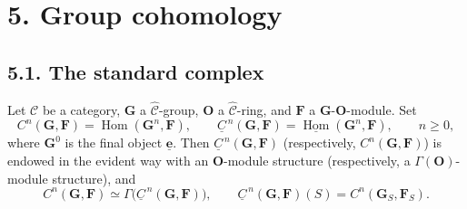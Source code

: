 
\section*{5. Group cohomology}

\subsection*{5.1. The standard complex}

Let \(\mathscr C\) be a category, \(\mathbf G\) a
\(\widehat{\mathscr C}\)-group, \(\mathbf O\) a
\(\widehat{\mathscr C}\)-ring, and \(\mathbf F\) a
\(\mathbf G\)-\(\mathbf O\)-module. Set
\[
  C^n(\mathbf G,\mathbf F)
    =\operatorname{Hom}(\mathbf G^n,\mathbf F),
  \qquad
  \underline C^{\,n}(\mathbf G,\mathbf F)
    =\underline{\operatorname{Hom}}(\mathbf G^n,\mathbf F),
  \qquad n\geq0,
\]
where \(\mathbf G^0\) is the final object \(\underline{\mathbf e}\).
Then \(\underline C^{\,n}(\mathbf G,\mathbf F)\) (respectively,
\(C^n(\mathbf G,\mathbf F)\)) is endowed in the evident way with an
\(\mathbf O\)-module structure (respectively, a
\(\Gamma(\mathbf O)\)-module structure), and
\[
  C^n(\mathbf G,\mathbf F)
    \simeq \Gamma\bigl(\underline C^{\,n}(\mathbf G,\mathbf F)\bigr),
  \qquad
  \underline C^{\,n}(\mathbf G,\mathbf F)(S)
    =C^n(\mathbf G_S,\mathbf F_S).
\]

